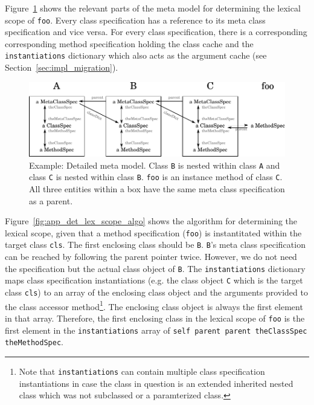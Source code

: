 Figure~\ref{fig:app_lex_scope} shows the relevant parts of the meta model for determining the lexical scope of \texttt{foo}. Every class specification has a reference to its meta class specification and vice versa. For every class specification, there is a corresponding corresponding method specification holding the class cache and the \texttt{instantiations} dictionary which also acts as the argument cache (see Section~\ref{sec:impl_migration}).

\begin{figure}[!htp]
\includegraphics[width=\textwidth]{lexical_scope_app_ex.pdf}
\caption[Example: Detailed meta model]{Example: Detailed meta model. Class \texttt{B} is nested within class \texttt{A} and class \texttt{C} is nested within class \texttt{B}. \texttt{foo} is an instance method of class \texttt{C}. All three entities within a box have the same meta class specification as a parent.}
\label{fig:app_lex_scope}
\end{figure}

Figure~\ref{fig:app_det_lex_scope_algo} shows the algorithm for determining the lexical scope, given that a method specification (\texttt{foo}) is instantitated within the target class \texttt{cls}. The first enclosing class should be \texttt{B}. \texttt{B}'s meta class specification can be reached by following the parent pointer twice. However, we do not need the specification but the actual class object of \texttt{B}. The \texttt{instantiations} dictionary maps class specification instantiations (e.g. the class object \texttt{C} which is the target class \texttt{cls}) to an array of the enclosing class object and the arguments provided to the class accessor method\footnote{Note that \texttt{instantiations} can contain multiple class specification instantiations in case the class in question is an extended inherited nested class which was not subclassed or a paramterized class.}. The enclosing class object is always the first element in that array. Therefore, the first enclosing class in the lexical scope of \texttt{foo} is the first element in the \texttt{instantiations} array of \texttt{self parent parent theClassSpec theMethodSpec}.

